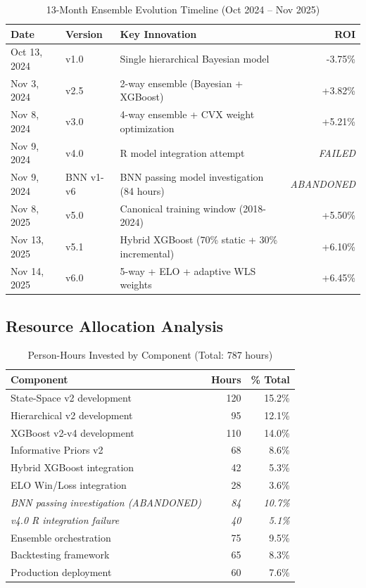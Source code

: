 \begin{table}[h]
\centering
\caption{13-Month Ensemble Evolution Timeline (Oct 2024 -- Nov 2025)}
\label{tab:complete-timeline}
\begin{tabular}{llp{6cm}r}
\toprule
\textbf{Date} & \textbf{Version} & \textbf{Key Innovation} & \textbf{ROI} \\
\midrule
Oct 13, 2024  & v1.0   & Single hierarchical Bayesian model & -3.75\% \\
Nov 3, 2024   & v2.5   & 2-way ensemble (Bayesian + XGBoost) & +3.82\% \\
Nov 8, 2024   & v3.0   & 4-way ensemble + CVX weight optimization & +5.21\% \\
Nov 9, 2024   & v4.0   & R model integration attempt & \textit{FAILED} \\
Nov 9, 2024   & BNN v1-v6 & BNN passing model investigation (84 hours) & \textit{ABANDONED} \\
Nov 8, 2025   & v5.0   & Canonical training window (2018-2024) & +5.50\% \\
Nov 13, 2025  & v5.1   & Hybrid XGBoost (70\% static + 30\% incremental) & +6.10\% \\
Nov 14, 2025  & v6.0   & 5-way + ELO + adaptive WLS weights & +6.45\% \\
\bottomrule
\end{tabular}
\end{table}

\subsection{Resource Allocation Analysis}

\begin{table}[h]
\centering
\caption{Person-Hours Invested by Component (Total: 787 hours)}
\label{tab:resource-allocation}
\begin{tabular}{lrr}
\toprule
\textbf{Component} & \textbf{Hours} & \textbf{\% Total} \\
\midrule
State-Space v2 development & 120 & 15.2\% \\
Hierarchical v2 development & 95 & 12.1\% \\
XGBoost v2-v4 development & 110 & 14.0\% \\
Informative Priors v2 & 68 & 8.6\% \\
Hybrid XGBoost integration & 42 & 5.3\% \\
ELO Win/Loss integration & 28 & 3.6\% \\
\midrule
\textit{BNN passing investigation (ABANDONED)} & \textit{84} & \textit{10.7\%} \\
\textit{v4.0 R integration failure} & \textit{40} & \textit{5.1\%} \\
\midrule
Ensemble orchestration & 75 & 9.5\% \\
Backtesting framework & 65 & 8.3\% \\
Production deployment & 60 & 7.6\% \\
\bottomrule
\end{tabular}
\end{table}

